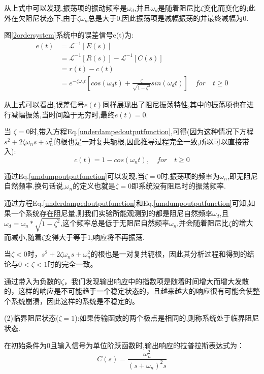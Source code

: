 \documentclass{article}
\numberwithin{equation}{section}
\numberwithin{figure}{section}
\begin{document}
从上式中可以发现,振荡项的振动频率是$\omega_d$,并且$\omega_d$是随着阻尼比$\zeta$变化而变化的;此外在欠阻尼状态下,由于$\zeta \omega_n$总是大于0,因此振荡项是减幅振荡的并最终减幅为0.

图\ref{2ordersystem}系统中的误差信号e(t)为:
\begin{equation}
    \begin{split}
        e(t)&=\mathscr{L}^{-1}[E(s)]\\
        &=\mathscr{L}^{-1}[R(s)]-\mathscr{L}^{-1}[C(s)]\\
        &=r(t)-c(t)\\
        &=e^{-\zeta\omega_nt}[cos(\omega_dt)+\frac{\zeta}{\sqrt{1-\zeta^2}}sin(\omega_dt)] \quad for \quad t≥0
    \end{split}
\end{equation}

从上式可以看出,误差信号$e(t)$同样展现出了阻尼振荡特性,其中的振荡项也在进行减幅振荡,当时间趋于无穷时,最终$e(t)=0$.

当 $\zeta=0$时,带入方程Eq.\ref{underdampedoutputfunction},可得(因为这种情况下方程$s^2+2\zeta \omega _ns+\omega _n^2$的根也是一对复共轭根,因此推导过程完全一致,所以可以直接带入):
\begin{equation}
    c(t)=1-cos(\omega_nt), \quad for \quad t≥0 \label{umdumpoutputfunction}
\end{equation}

通过Eq.\ref{umdumpoutputfunction}可以发现,当$\zeta=0$时,振荡项的频率为$\omega_n$,即无阻尼自然频率.换句话说,$\omega_n$的定义也就是$\zeta=0$即系统没有阻尼时的振荡频率.

通过方程Eq.\ref{underdampedoutputfunction}和Eq.\ref{umdumpoutputfunction}可知,如果一个系统存在阻尼量,则我们实验所能观测到的都是阻尼自然频率$\omega_d$,且$\omega_d=\omega_n*\sqrt{1-\zeta^2}$,这个频率总是低于无阻尼自然频率$\omega_n$,并会随着阻尼比$\zeta$的增大而减小,随着$\zeta$变得大于等于1,响应将不再振荡.

当$\zeta<0$时，$s^2+2\zeta \omega _ns+\omega _n^2$的根也是一对复共轭根，因此其分析过程和得到的结论与$0<\zeta<1$时的完全一致。

通过带入为负数的$\zeta$，我们发现输出响应中的指数项是随着时间增大而增大发散的，这样的响应是不可能趋于一个稳定状态的，且越来越大的响应很有可能会使整个系统崩溃，因此这样的系统是不稳定的。

(2)临界阻尼状态($\zeta=1$):如果传输函数的两个极点是相同的,则称系统处于临界阻尼状态.

在初始条件为0且输入信号为单位阶跃函数时,输出响应的拉普拉斯表达式为：
\begin{equation}
    C(s)=\frac{\omega_n^2}{(s+\omega_n)^2s}\label{criticaldumpoutputfunction}
\end{equation}
\end{document}
